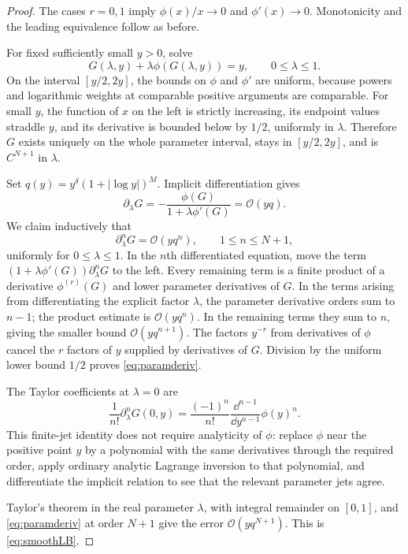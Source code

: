 \documentclass[11pt,a4paper]{article}
\numberwithin{equation}{section}
\theoremstyle{definition}\newtheorem{definition}[theorem]{Definition}
\theoremstyle{remark}\newtheorem{remark}[theorem]{Remark}
\newcommand{\OO}{\mathcal O}\newcommand{\Id}{\mathrm{id}}
\begin{document}
\begin{proof}
The cases $r=0,1$ imply $\phi(x)/x\to0$ and $\phi'(x)\to0$. Monotonicity and the leading equivalence follow as before.

For fixed sufficiently small $y>0$, solve
\[
G(\lambda,y)+\lambda\phi(G(\lambda,y))=y,
\qquad 0\le\lambda\le1.
\]
On the interval $[y/2,2y]$, the bounds on $\phi$ and $\phi'$ are uniform, because powers and logarithmic weights at comparable positive arguments are comparable. For small $y$, the function of $x$ on the left is strictly increasing, its endpoint values straddle $y$, and its derivative is bounded below by $1/2$, uniformly in $\lambda$. Therefore $G$ exists uniquely on the whole parameter interval, stays in $[y/2,2y]$, and is $C^{N+1}$ in $\lambda$.

Set $q(y)=y^\delta(1+|\log y|)^M$. Implicit differentiation gives
\[
\partial_\lambda G=-\frac{\phi(G)}{1+\lambda\phi'(G)}=\OO(yq).
\]
We claim inductively that
\begin{equation}\label{eq:paramderiv}
\partial_\lambda^nG=\OO(yq^n),\qquad 1\le n\le N+1,
\end{equation}
uniformly for $0\le\lambda\le1$. In the $n$th differentiated equation, move the term $(1+\lambda\phi'(G))\partial_\lambda^nG$ to the left. Every remaining term is a finite product of a derivative $\phi^{(r)}(G)$ and lower parameter derivatives of $G$. In the terms arising from differentiating the explicit factor $\lambda$, the parameter derivative orders sum to $n-1$; the product estimate is $\OO(yq^n)$. In the remaining terms they sum to $n$, giving the smaller bound $\OO(yq^{n+1})$. The factors $y^{-r}$ from derivatives of $\phi$ cancel the $r$ factors of $y$ supplied by derivatives of $G$. Division by the uniform lower bound $1/2$ proves \eqref{eq:paramderiv}.

The Taylor coefficients at $\lambda=0$ are
\[
\frac1{n!}\partial_\lambda^nG(0,y)
=\frac{(-1)^n}{n!}\frac{\dd^{n-1}}{\dd y^{n-1}}\phi(y)^n.
\]
This finite-jet identity does not require analyticity of $\phi$: replace $\phi$ near the positive point $y$ by a polynomial with the same derivatives through the required order, apply ordinary analytic Lagrange inversion to that polynomial, and differentiate the implicit relation to see that the relevant parameter jets agree.

Taylor's theorem in the real parameter $\lambda$, with integral remainder on $[0,1]$, and \eqref{eq:paramderiv} at order $N+1$ give the error $\OO(yq^{N+1})$. This is \eqref{eq:smoothLB}.
\end{proof}
\end{document}
